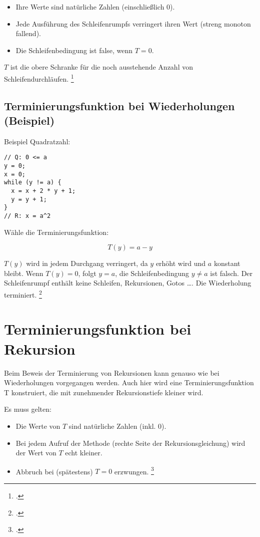 \documentclass{lehramt-informatik-haupt}
\begin{document}
\begin{itemize}
\item Ihre Werte sind natürliche Zahlen (einschließlich 0).

\item Jede Ausführung des Schleifenrumpfs verringert ihren Wert (streng
monoton fallend).

\item Die Schleifenbedingung ist false, wenn $T = 0$.
\end{itemize}

$T$ ist die obere Schranke für die noch ausstehende Anzahl von
Schleifendurchläufen.
\footcite[Seite 33]{sosy:fs:5}

%

\subsection{Terminierungsfunktion bei Wiederholungen (Beispiel)}

Beispiel Quadratzahl:

\begin{verbatim}
// Q: 0 <= a
y = 0;
x = 0;
while (y != a) {
  x = x + 2 * y + 1;
  y = y + 1;
}
// R: x = a^2
\end{verbatim}

\noindent
Wähle die Terminierungsfunktion:

\begin{displaymath}
T(y) = a - y
\end{displaymath}

\noindent
$T(y)$ wird in jedem Durchgang verringert, da $y$ erhöht wird und $a$
konstant bleibt. Wenn $T(y) = 0$, folgt $y = a$, \dh die
Schleifenbedingung $y \neq a$ ist falsch. Der Schleifenrumpf enthält
keine Schleifen, Rekursionen, Gotos …. Die Wiederholung terminiert.
\footcite[Seite 34]{sosy:fs:5}

\section{Terminierungsfunktion bei Rekursion}

Beim Beweis der Terminierung von Rekursionen kann
genauso wie bei Wiederholungen vorgegangen werden.
Auch hier wird eine Terminierungsfunktion T konstruiert,
die mit zunehmender Rekursionstiefe kleiner wird.

Es muss gelten:
\begin{itemize}
\item Die Werte von $T$ sind natürliche Zahlen (inkl. $0$).

\item Bei jedem Aufruf der Methode (rechte Seite der
Rekursionsgleichung) wird der Wert von $T$ echt kleiner.

\item Abbruch bei (spätestens) $T = 0$ erzwungen.
\footcite[Seite 36]{sosy:fs:5}
\end{itemize}
\end{document}
